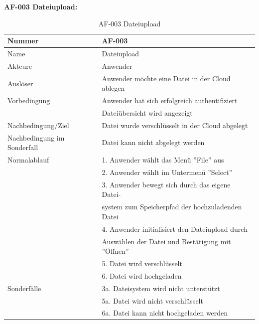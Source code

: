 \documentclass[12pt,a4paper,bibliography=totocnumbered,listof=totocnumbered]{scrartcl}
\begin{document}
\textbf{AF-003 Dateiupload:}
\begin{table}[!h]
	\centering
	\begin{tabular}{|l|l|}
		\hline
		Nummer & AF-003\\
		\hline
		Name & Dateiupload\\
		\hline
		Akteure & Anwender\\
		\hline
		Auslöser & Anwender möchte eine Datei in der Cloud ablegen\\
		\hline
		Vorbedingung & Anwender hat sich erfolgreich authentifiziert \\ & Dateiübersicht wird angezeigt\\
		\hline
		Nachbedingung/Ziel & Datei wurde verschlüsselt in der Cloud abgelegt \\
		\hline
		Nachbedingung im Sonderfall & Datei kann nicht abgelegt werden\\
		\hline
		Normalablauf & 1. Anwender wählt das Menü ''File'' aus \\ & 2. Anwender wählt im Untermenü ''Select'' \\ & 3. Anwender bewegt sich durch das eigene  Datei- \\ & system zum Speicherpfad der hochzuladenden Datei \\ & 4. Anwender initialisiert den Dateiupload durch \\ &  Auswählen der Datei und Bestätigung mit ''Öffnen'' \\  & 5. Datei wird verschlüsselt \\ & 6. Datei wird hochgeladen \\
		\hline
		Sonderfälle & 3a. Dateisystem wird nicht unterstützt \\& 5a. Datei wird nicht verschlüsselt \\ & 6a. Datei kann nicht hochgeladen werden\\
		\hline
	\end{tabular}
	\caption{AF-003 Dateiupload}
	\label{tab:AF-003 Dateiupload}
\end{table}
\pagebreak
\end{document}
